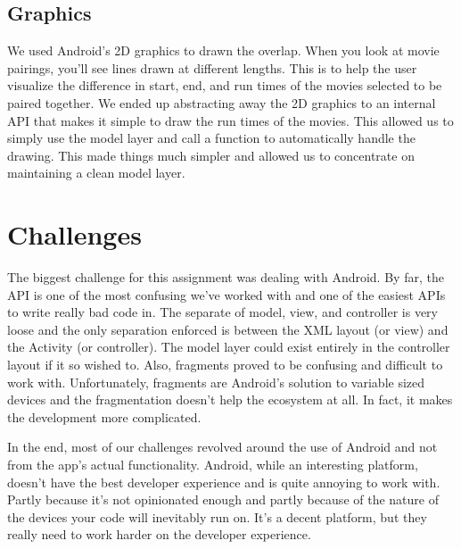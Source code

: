 \documentclass{article}
\begin{document}
    \subsection*{Graphics}
    We used Android's 2D graphics to drawn the overlap. When you look at movie pairings, you'll see lines
    drawn at different lengths. This is to help the user visualize the difference in start, end, and run
    times of the movies selected to be paired together. We ended up abstracting away the 2D graphics
    to an internal API that makes it simple to draw the run times of the movies. This allowed us to simply
    use the model layer and call a function to automatically handle the drawing. This made things much simpler
    and allowed us to concentrate on maintaining a clean model layer.
    \section*{Challenges}
    The biggest challenge for this assignment was dealing with Android. By far, the API is one of the most
    confusing we've worked with and one of the easiest APIs to write really bad code in. The separate of
    model, view, and controller is very loose and the only separation enforced is between the XML layout
    (or view) and the Activity (or controller). The model layer could exist entirely in the controller
    layout if it so wished to. Also, fragments proved to be confusing and difficult to work with. Unfortunately,
    fragments are Android's solution to variable sized devices and the fragmentation doesn't help the ecosystem
    at all. In fact, it makes the development more complicated.

    In the end, most of our challenges revolved around the use of Android and not from the app's actual
    functionality. Android, while an interesting platform, doesn't have the best developer experience
    and is quite annoying to work with. Partly because it's not opinionated enough and partly because
    of the nature of the devices your code will inevitably run on. It's a decent platform, but they
    really need to work harder on the developer experience.
\end{document}
